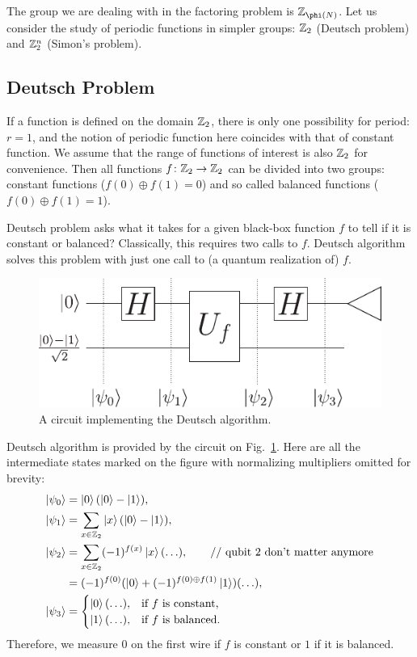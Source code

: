 \documentclass{article}
\begin{document}
The group we are dealing with in the factoring problem is $\Z_{\phi(N)}$.
Let us consider the study of periodic functions in simpler groups:
$\mathbb Z_2$ (Deutsch problem) and $\mathbb Z^n_2$ (Simon's problem).

\subsection{Deutsch Problem}

If a function is defined on the domain $\mathbb Z_2$, there is only one possibility for period: 
$r=1$,
and the notion of periodic function here coincides with that of constant function. 
We assume that the range of functions of interest is also $\mathbb Z_2$ for convenience. 
Then all functions $f\colon \mathbb Z_2 \to \mathbb Z_2$ can be divided into two groups: constant 
functions ($f(0) \oplus f(1) = 0$) and so called  balanced functions ($f(0) \oplus f(1) = 1$).

Deutsch problem asks what it takes for a given black-box function $f$ to 
tell if it is constant or balanced?
Classically, this requires two calls to $f$. 
Deutsch algorithm solves
this problem with just one call to (a quantum realization of) $f$.

\begin{figure}
    \centering
    \includegraphics[width=0.8\linewidth]{pics/deutsch.pdf}
    \caption{A circuit implementing the Deutsch algorithm.}
    \label{fig:deutsch}
\end{figure}

Deutsch algorithm is provided by the circuit on Fig.~\ref{fig:deutsch}.
Here are all the intermediate states marked on the figure with normalizing 
multipliers omitted for brevity:
\begin{align*}
  \ket{\psi_0} &= \ket{0} ( \ket{0} - \ket{1} ),\\
  \ket{\psi_1} &= \sum_{x \in \mathbb Z_2}\ket{x} (\ket{0} - \ket{1}),\\
  \ket{\psi_2} &= \sum_{x \in \mathbb Z_2} (-1)^{f(x)}  \ket{x} (\ldots), \qquad \text{// qubit 2 don't matter anymore} \\ 
               &= (-1)^{f(0)}(\ket{0} + (-1)^{f(0)\oplus f(1)}\ket{1})(\ldots),\\
  \ket{\psi_3} &=
    \begin{cases}
    \ket{0}(\ldots), & \text{if $f$ is constant,}\\
    \ket{1}(\ldots), & \text{if $f$ is balanced.}
    \end{cases}
\end{align*}
Therefore, we measure $0$ on the first wire if $f$ is constant or $1$
if it is balanced.
\end{document}
